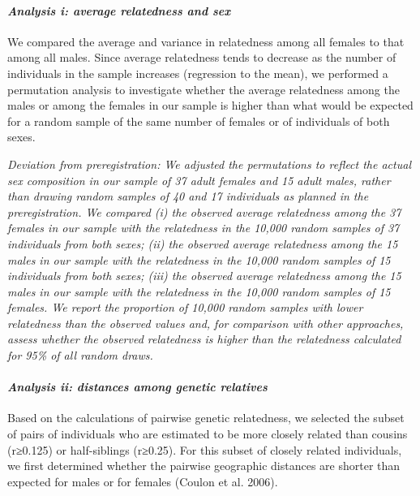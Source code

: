 \documentclass[
]{article}
\begin{document}
\hypertarget{analysis-i-average-relatedness-and-sex}{%
\paragraph{\texorpdfstring{\emph{Analysis i: average relatedness and
sex}}{Analysis i: average relatedness and sex}}\label{analysis-i-average-relatedness-and-sex}}

We compared the average and variance in relatedness among all females to
that among all males. Since average relatedness tends to decrease as the
number of individuals in the sample increases (regression to the mean),
we performed a permutation analysis to investigate whether the average
relatedness among the males or among the females in our sample is higher
than what would be expected for a random sample of the same number of
females or of individuals of both sexes.

\emph{Deviation from preregistration: We adjusted the permutations to
reflect the actual sex composition in our sample of 37 adult females and
15 adult males, rather than drawing random samples of 40 and 17
individuals as planned in the preregistration. We compared (i) the
observed average relatedness among the 37 females in our sample with the
relatedness in the 10,000 random samples of 37 individuals from both
sexes; (ii) the observed average relatedness among the 15 males in our
sample with the relatedness in the 10,000 random samples of 15
individuals from both sexes; (iii) the observed average relatedness
among the 15 males in our sample with the relatedness in the 10,000
random samples of 15 females. We report the proportion of 10,000 random
samples with lower relatedness than the observed values and, for
comparison with other approaches, assess whether the observed
relatedness is higher than the relatedness calculated for 95\% of all
random draws.}

\hypertarget{analysis-ii-distances-among-genetic-relatives}{%
\paragraph{\texorpdfstring{\emph{Analysis ii: distances among genetic
relatives}}{Analysis ii: distances among genetic relatives}}\label{analysis-ii-distances-among-genetic-relatives}}

Based on the calculations of pairwise genetic relatedness, we selected
the subset of pairs of individuals who are estimated to be more closely
related than cousins (r≥0.125) or half-siblings (r≥0.25). For this
subset of closely related individuals, we first determined whether the
pairwise geographic distances are shorter than expected for males or for
females (Coulon et al. 2006).
\end{document}
